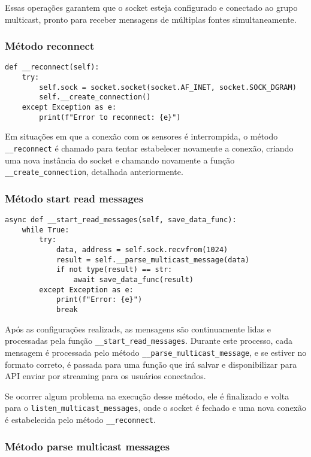 Essas operações garantem que o socket esteja configurado e conectado ao grupo multicast, pronto para receber mensagens de múltiplas fontes simultaneamente.


\subsubsection[Método reconnect]{Método reconnect}
\begin{verbatim}
def __reconnect(self):
    try:
        self.sock = socket.socket(socket.AF_INET, socket.SOCK_DGRAM)
        self.__create_connection()
    except Exception as e:
        print(f"Error to reconnect: {e}")
\end{verbatim}

Em situações em que a conexão com os sensores é interrompida, o método \texttt{\_\_reconnect} é chamado para tentar estabelecer novamente a conexão, criando uma nova instância do socket e chamando novamente a função \texttt{\_\_create\_connection}, detalhada anteriormente.

\subsubsection[Método start read messages]{Método start read messages}

\begin{verbatim}
async def __start_read_messages(self, save_data_func):
    while True:
        try:
            data, address = self.sock.recvfrom(1024)
            result = self.__parse_multicast_message(data)
            if not type(result) == str:
                await save_data_func(result)
        except Exception as e:
            print(f"Error: {e}")
            break
\end{verbatim}

Após as configurações realizads, as mensagens são continuamente lidas e processadas pela função \texttt{\_\_start\_read\_messages}. Durante este processo, cada mensagem é processada pelo método \texttt{\_\_parse\_multicast\_message}, e se estiver no formato correto, é passada para uma função que irá salvar e disponibilizar para API enviar por streaming para os usuários conectados.

Se ocorrer algum problema na execução desse método, ele é finalizado e volta para o \texttt{listen\_multicast\_messages}, onde o socket é fechado e uma nova conexão é estabelecida pelo método \texttt{\_\_reconnect}.


\subsubsection[Método parse multicast messages]{Método parse multicast messages}


